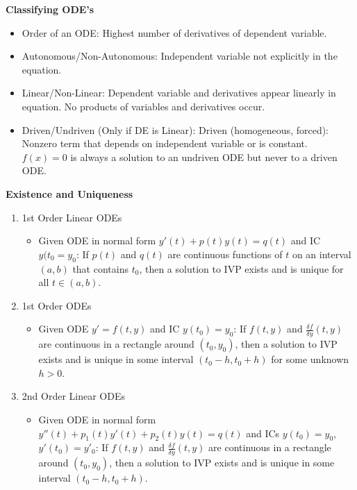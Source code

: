 \documentclass[8pt,letterpaper,boxed]{hmcpset}
\begin{document}


\textbf{Classifying ODE's}
\begin{itemize}
    \item Order of an ODE: Highest number of derivatives of dependent variable.
    \item Autonomous/Non-Autonomous: Independent variable not explicitly in the equation.
    \item Linear/Non-Linear: Dependent variable and derivatives appear linearly in equation. No products of variables and derivatives occur.
    \item Driven/Undriven (Only if DE is Linear): Driven (homogeneous, forced): Nonzero term that depends on independent variable or is constant. $f(x) = 0$ is always a solution to an undriven ODE but never to a driven ODE.
\end{itemize}

\textbf{Existence and Uniqueness}
\begin{enumerate}
    \item 1st Order Linear ODEs
    \begin{itemize}
        \item Given ODE in normal form $y'(t) + p(t)y(t) = q(t)$ and IC $y(t_0 = y_0$: If $p(t)$ and $q(t)$ are continuous functions of $t$ on an interval $(a, b)$ that contains $t_0$, then a solution to IVP exists and is unique for all $t \in (a, b)$.
    \end{itemize}
    \item 1st Order ODEs
    \begin{itemize}
        \item Given ODE $y' = f(t, y)$ and IC $y(t_0) = y_0$: If $f(t, y)$ and $\frac{\delta f}{\delta y} (t, y)$ are continuous in a rectangle around $(t_0, y_0)$, then a solution to IVP exists and is unique in some interval $(t_0-h, t_0+h)$ for some unknown $h>0$.
    \end{itemize}
    \item 2nd Order Linear ODEs
    \begin{itemize}
        \item Given ODE in normal form $y''(t) + p_1(t)y'(t) + p_2(t)y(t) = q(t)$ and ICs $y(t_0) = y_0$, $y'(t_0) = y'_0$: If $f(t, y)$ and $\frac{\delta f}{\delta y} (t, y)$ are continuous in a rectangle around $(t_0, y_0)$, then a solution to IVP exists and is unique in some interval $(t_0-h, t_0+h)$.
    \end{itemize}
\end{enumerate}
\end{document}
